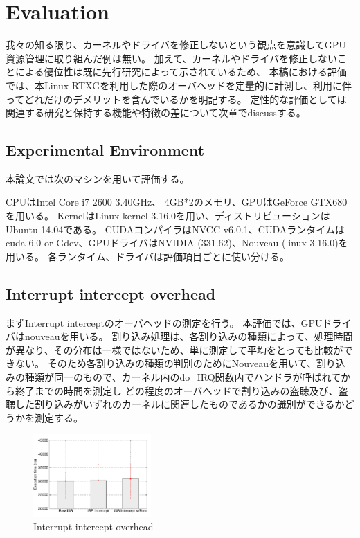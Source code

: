 \section{Evaluation}
我々の知る限り、カーネルやドライバを修正しないという観点を意識してGPU資源管理に取り組んだ例は無い。
加えて、カーネルやドライバを修正しないことによる優位性は既に先行研究\cite{resch}によって示されているため、
本稿における評価では、本Linux-RTXGを利用した際のオーバヘッドを定量的に計測し、利用に伴ってどれだけのデメリットを含んでいるかを明記する。
定性的な評価としては関連する研究と保持する機能や特徴の差について次章でdiscussする。

\subsection{Experimental Environment}
本論文では次のマシンを用いて評価する。

CPUはIntel Core i7 2600 3.40GHz、
4GB*2のメモリ、GPUはGeForce GTX680を用いる。
KernelはLinux kernel 3.16.0を用い、ディストリビューションはUbuntu 14.04である。
CUDAコンパイラはNVCC v6.0.1、CUDAランタイムはcuda-6.0 or Gdev、GPUドライバはNVIDIA (331.62)、Nouveau (linux-3.16.0)を用いる。
各ランタイム、ドライバは評価項目ごとに使い分ける。

\subsection{Interrupt intercept overhead}
まずInterrupt interceptのオーバヘッドの測定を行う。
本評価では、GPUドライバはnouveauを用いる。
割り込み処理は、各割り込みの種類によって、処理時間が異なり、その分布は一様ではないため、単に測定して平均をとっても比較ができない。
そのため各割り込みの種類の判別のためにNouveauを用いて、割り込みの種類が同一のもので、カーネル内のdo\_IRQ関数内でハンドラが呼ばれてから終了までの時間を測定し
どの程度のオーバヘッドで割り込みの盗聴及び、盗聴した割り込みがいずれのカーネルに関連したものであるかの識別ができるかどうかを測定する。

\begin{figure}[t]
\begin{center}
\includegraphics[width=0.4\textwidth]{img/interrupt.pdf}
\caption{Interrupt intercept overhead}
\end{center}
\label{fig:irq_overhead}
\end{figure}


